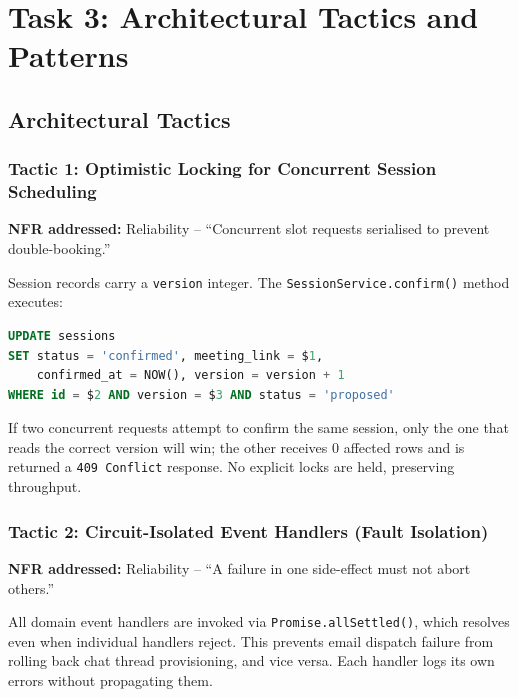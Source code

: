 \documentclass[12pt,a4paper]{article}
\begin{document}
\newpage

\section{Task 3: Architectural Tactics and Patterns}

\subsection{Architectural Tactics}

\subsubsection{Tactic 1: Optimistic Locking for Concurrent Session Scheduling}

\textbf{NFR addressed:} Reliability -- ``Concurrent slot requests serialised to prevent double-booking.''

Session records carry a \texttt{version} integer. The \texttt{SessionService.confirm()} method executes:

\begin{lstlisting}[language=SQL, caption={Optimistic locking in session confirmation}]
UPDATE sessions
SET status = 'confirmed', meeting_link = $1,
    confirmed_at = NOW(), version = version + 1
WHERE id = $2 AND version = $3 AND status = 'proposed'
\end{lstlisting}

If two concurrent requests attempt to confirm the same session, only the one that reads the correct version will win; the other receives 0 affected rows and is returned a \texttt{409 Conflict} response. No explicit locks are held, preserving throughput.

\subsubsection{Tactic 2: Circuit-Isolated Event Handlers (Fault Isolation)}

\textbf{NFR addressed:} Reliability -- ``A failure in one side-effect must not abort others.''

All domain event handlers are invoked via \texttt{Promise.allSettled()}, which resolves even when individual handlers reject. This prevents email dispatch failure from rolling back chat thread provisioning, and vice versa. Each handler logs its own errors without propagating them.
\end{document}

